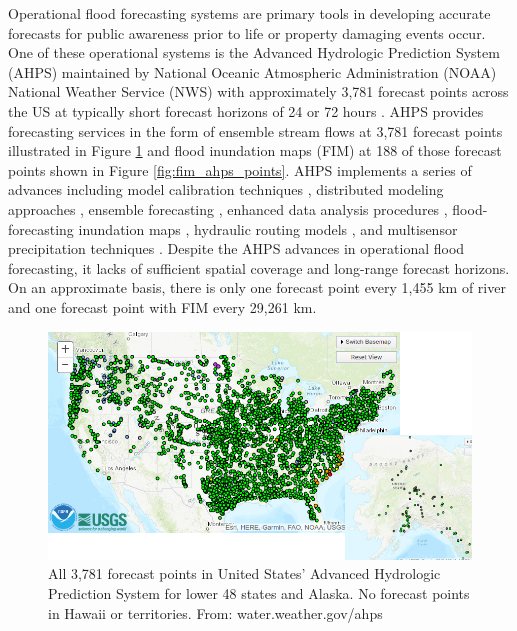 Operational flood forecasting systems are primary tools in developing accurate forecasts for public awareness prior to life or property damaging events occur. 
One of these operational systems is the Advanced Hydrologic Prediction System (AHPS) maintained by National Oceanic Atmospheric Administration (NOAA) National Weather Service (NWS) with approximately 3,781 forecast points across the US at typically short forecast horizons of 24 or 72 hours \cite{mcenery2005noaa}.
AHPS provides forecasting services in the form of ensemble stream flows at 3,781 forecast points illustrated in Figure \ref{fig:all_ahps_points} and flood inundation maps (FIM) at 188 of those forecast points shown in Figure \ref{fig:fim_ahps_points}.
AHPS implements a series of advances including model calibration techniques \cite{zhang2003hydrologic,hogue2003multi,duan2003global,gupta2003advances,parada2003multi}, distributed modeling approaches \cite{reed2004overall,koren2004hydrology,duan2002results}, ensemble forecasting \cite{day1985extended,seo2000simulation,mullusky2002simplified,herr2002simplified}, enhanced data analysis procedures \cite{mcenery2005noaa}, flood-forecasting inundation maps \cite{cajina2002fldview}, hydraulic routing models \cite{fread1973technique,cajina2002fldview}, and multisensor precipitation techniques \cite{breidenbach1999accounting,kondragunta2001outlier,seo2002real,bonnin1996noaa}.
Despite the AHPS advances in operational flood forecasting, it lacks of sufficient spatial coverage and long-range forecast horizons.
On an approximate basis, there is only one forecast point every 1,455 km of river and one forecast point with FIM every 29,261 km.

\begin{figure}[h!]
\centering
\includegraphics[scale=2.0]{figs/ahps_all_forecast_points.jpg}
\caption{All 3,781 forecast points in United States' Advanced Hydrologic Prediction System for lower 48 states and Alaska. No forecast points in Hawaii or territories. From: water.weather.gov/ahps}
\label{fig:all_ahps_points}
\end{figure}

